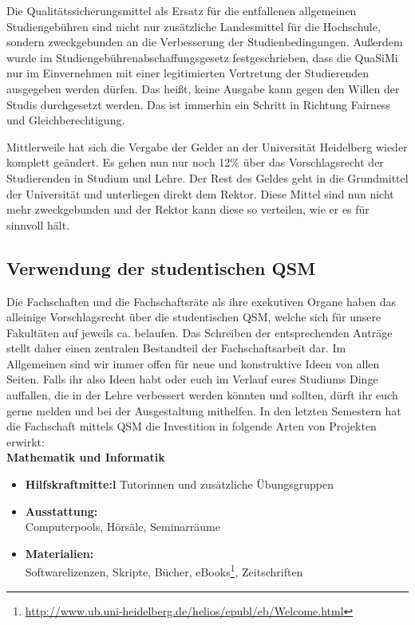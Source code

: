 Die Qualitätssicherungsmittel als Ersatz für die entfallenen allgemeinen Studiengebühren sind nicht nur zusätzliche Landesmittel für die Hochschule, sondern zweckgebunden an die Verbesserung der Studienbedingungen. Außerdem wurde im Studien\-gebühren\-abschaffungs\-gesetz festgeschrieben, dass die QuaSiMi nur im Einvernehmen mit einer legitimierten Vertretung der Studierenden ausgegeben werden dürfen. Das heißt, keine Ausgabe kann gegen den Willen der Studis durchgesetzt werden. Das ist immerhin ein Schritt in Richtung Fairness und Gleichberechtigung.

Mittlerweile hat sich die Vergabe der Gelder an der Universität Heidelberg wieder komplett geändert. Es gehen nun nur noch 12\% über das Vorschlagsrecht der Studierenden in Studium und Lehre. Der Rest des Geldes geht in die Grundmittel der Universität und unterliegen direkt dem Rektor. Diese Mittel sind nun nicht mehr zweckgebunden und der Rektor kann diese so verteilen, wie er es für sinnvoll hält. 

\subsection{Verwendung der studentischen QSM}
Die Fachschaften und die Fachschaftsräte als ihre exekutiven Organe haben das alleinige Vorschlagsrecht über die studentischen QSM, welche sich für unsere Fakultäten auf jeweils ca.  belaufen. Das Schreiben der entsprechenden Anträge stellt daher einen zentralen Bestandteil der Fachschaftsarbeit dar. Im Allgemeinen sind wir immer offen für neue und konstruktive Ideen von allen Seiten. Falls ihr also Ideen habt oder euch im Verlauf eures Studiums Dinge auffallen, die in der Lehre verbessert werden könnten und sollten, dürft ihr euch gerne melden und bei der Ausgestaltung mithelfen. In den letzten Semestern hat die Fachschaft mittels QSM die Investition in folgende Arten von Projekten erwirkt:\\

\textbf{Mathematik und Informatik}
\begin{itemize}
\item \textbf{Hilfskraftmitte:l} Tutorinnen und zusätzliche Übungsgruppen
\item \textbf{Ausstattung:}\\ Computerpools, Hörsäle, Seminarräume
\item \textbf{Materialien:}\\ Softwarelizenzen, Skripte, Bücher, eBooks\footnote{\url{http://www.ub.uni-heidelberg.de/helios/epubl/eb/Welcome.html}}, Zeitschriften
\end{itemize}

